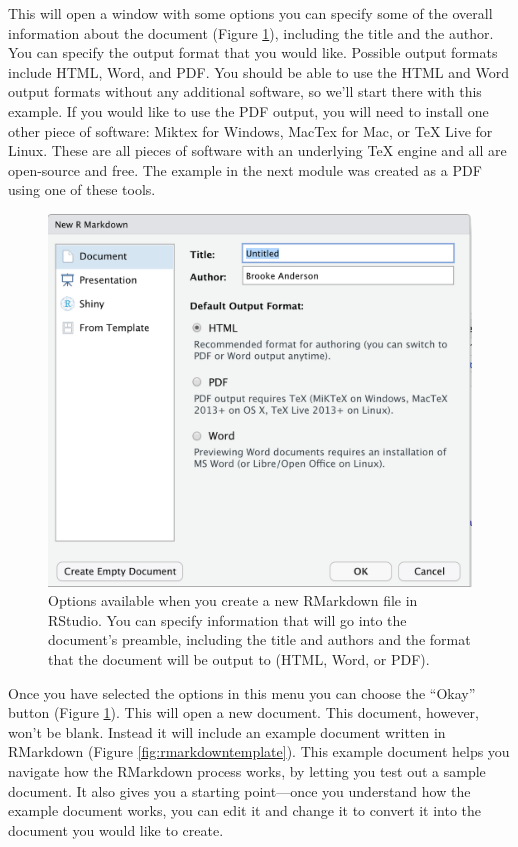 \documentclass[]{tufte-book}
\begin{document}
This will open a window with some options you can specify some of the overall
information about the document (Figure \ref{fig:rmarkdownchoices}), including
the title and the author. You can specify the output format that you would
like. Possible output formats include HTML, Word, and PDF. You should be able to
use the HTML and Word output formats without any additional software, so we'll start
there with this example. If you
would like to use the PDF output, you will need to install one other piece of
software: Miktex for Windows, MacTex for Mac, or TeX Live for Linux. These are
all pieces of software with an underlying TeX engine and all are open-source and
free. The example in the next module was created as a PDF using one of these tools.

\begin{figure}
\includegraphics[width=\textwidth]{figures/rmarkdown_choices} \caption[Options available when you create a new RMarkdown file in RStudio]{Options available when you create a new RMarkdown file in RStudio. You can specify information that will go into the document's preamble, including the title and authors and the format that the document will be output to (HTML, Word, or PDF).}\label{fig:rmarkdownchoices}
\end{figure}

Once you have selected the options in this menu you can choose the ``Okay'' button
(Figure \ref{fig:rmarkdownchoices}). This will open a new document. This
document, however, won't be blank. Instead it will include an example document
written in RMarkdown (Figure \ref{fig:rmarkdowntemplate}). This example
document helps you navigate how the RMarkdown process works, by letting you test
out a sample document. It also gives you a starting point---once you understand
how the example document works, you can edit it and change it to convert it
into the document you would like to create.
\end{document}

